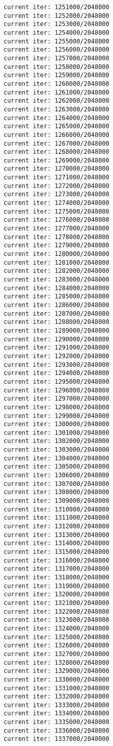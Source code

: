 \documentclass[11pt]{article}
\begin{document}
\begin{Verbatim}[commandchars=\\\{\}]
current iter: 1251000/2048000
current iter: 1252000/2048000
current iter: 1253000/2048000
current iter: 1254000/2048000
current iter: 1255000/2048000
current iter: 1256000/2048000
current iter: 1257000/2048000
current iter: 1258000/2048000
current iter: 1259000/2048000
current iter: 1260000/2048000
current iter: 1261000/2048000
current iter: 1262000/2048000
current iter: 1263000/2048000
current iter: 1264000/2048000
current iter: 1265000/2048000
current iter: 1266000/2048000
current iter: 1267000/2048000
current iter: 1268000/2048000
current iter: 1269000/2048000
current iter: 1270000/2048000
current iter: 1271000/2048000
current iter: 1272000/2048000
current iter: 1273000/2048000
current iter: 1274000/2048000
current iter: 1275000/2048000
current iter: 1276000/2048000
current iter: 1277000/2048000
current iter: 1278000/2048000
current iter: 1279000/2048000
current iter: 1280000/2048000
current iter: 1281000/2048000
current iter: 1282000/2048000
current iter: 1283000/2048000
current iter: 1284000/2048000
current iter: 1285000/2048000
current iter: 1286000/2048000
current iter: 1287000/2048000
current iter: 1288000/2048000
current iter: 1289000/2048000
current iter: 1290000/2048000
current iter: 1291000/2048000
current iter: 1292000/2048000
current iter: 1293000/2048000
current iter: 1294000/2048000
current iter: 1295000/2048000
current iter: 1296000/2048000
current iter: 1297000/2048000
current iter: 1298000/2048000
current iter: 1299000/2048000
current iter: 1300000/2048000
current iter: 1301000/2048000
current iter: 1302000/2048000
current iter: 1303000/2048000
current iter: 1304000/2048000
current iter: 1305000/2048000
current iter: 1306000/2048000
current iter: 1307000/2048000
current iter: 1308000/2048000
current iter: 1309000/2048000
current iter: 1310000/2048000
current iter: 1311000/2048000
current iter: 1312000/2048000
current iter: 1313000/2048000
current iter: 1314000/2048000
current iter: 1315000/2048000
current iter: 1316000/2048000
current iter: 1317000/2048000
current iter: 1318000/2048000
current iter: 1319000/2048000
current iter: 1320000/2048000
current iter: 1321000/2048000
current iter: 1322000/2048000
current iter: 1323000/2048000
current iter: 1324000/2048000
current iter: 1325000/2048000
current iter: 1326000/2048000
current iter: 1327000/2048000
current iter: 1328000/2048000
current iter: 1329000/2048000
current iter: 1330000/2048000
current iter: 1331000/2048000
current iter: 1332000/2048000
current iter: 1333000/2048000
current iter: 1334000/2048000
current iter: 1335000/2048000
current iter: 1336000/2048000
current iter: 1337000/2048000

\end{Verbatim}
\end{document}
